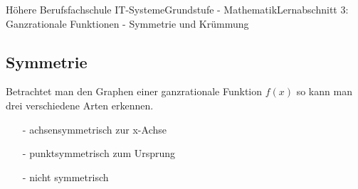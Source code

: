 \documentclass[11pt,twocolumn,oneside,openany,headings=optiontotoc,11pt,numbers=noenddot]{article}
\begin{document}
	\begin{worksheet}{Höhere Berufsfachschule IT-Systeme}{Grundstufe - Mathematik}{Lernabschnitt 3: Ganzrationale Funktionen - Symmetrie und Krümmung}
		\setcounter{section}{6}
		\setcounter{subsection}{3}
		\noindent
		\subsection{Symmetrie}
		Betrachtet man den Graphen einer ganzrationale Funktion \(f(x)\) so kann man drei verschiedene Arten erkennen.
		\begin{itemize}
			\item[-] achsensymmetrisch zur x-Achse
			\item[-] punktsymmetrisch zum Ursprung
			\item[-] nicht symmetrisch
		\end{itemize}

\end{worksheet}
\end{document}
